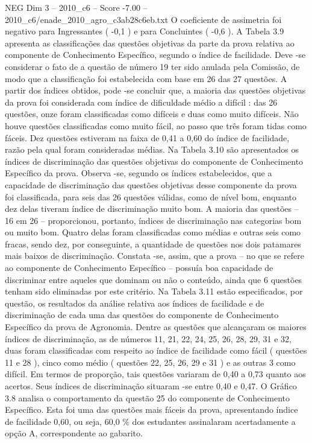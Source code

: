 \begin{textsample}{NEG Dim 3 – 2010\_c6 – Score -7.00 – 2010\_c6/enade\_2010\_agro\_c3ab28c6eb.txt}
O coeficiente de assimetria foi negativo para Ingressantes ( -0,1 ) e para Concluintes ( -0,6 ).
A Tabela 3.9 apresenta as classificações das questões objetivas da parte da prova relativa ao componente de Conhecimento Específico, segundo o índice de facilidade.
Deve -se considerar o fato de a questão de número 19 ter sido anulada pela Comissão, de modo que a classificação foi estabelecida com base em 26 das 27 questões.
A partir dos índices obtidos, pode -se concluir que, a maioria das questões objetivas da prova foi considerada com índice de dificuldade médio a difícil : das 26 questões, onze foram classificadas como difíceis e duas como muito difíceis.
Não houve questões classificadas como muito fácil, ao passo que três foram tidas como fáceis.
Dez questões estiveram na faixa de 0,41 a 0,60 do índice de facilidade, razão pela qual foram consideradas médias.
Na Tabela 3.10 são apresentados os índices de discriminação das questões objetivas do componente de Conhecimento Específico da prova.
Observa -se, segundo os índices estabelecidos, que a capacidade de discriminação das questões objetivas desse componente da prova foi classificada, para seis das 26 questões válidas, como de nível bom, enquanto dez delas tiveram índice de discriminação muito bom.
A maioria das questões – 16 em 26 – proporcionou, portanto, índices de discriminação nas categorias bom ou muito bom.
Quatro delas foram classificadas como médias e outras seis como fracas, sendo dez, por conseguinte, a quantidade de questões nos dois patamares mais baixos de discriminação.
Constata -se, assim, que a prova – no que se refere ao componente de Conhecimento Específico – possuía boa capacidade de discriminar entre aqueles que dominam ou não o conteúdo, ainda que 6 questões tenham sido eliminadas por este critério.
Na Tabela 3.11 estão especificados, por questão, os resultados da análise relativa aos índices de facilidade e de discriminação de cada uma das questões do componente de Conhecimento Específico da prova de Agronomia.
Dentre as questões que alcançaram os maiores índices de discriminação, as de números 11, 21, 22, 24, 25, 26, 28, 29, 31 e 32, duas foram classificadas com respeito ao índice de facilidade como fácil ( questões 11 e 28 ), cinco como médio ( questões 22, 25, 26, 29 e 31 ) e as outras 3 como difícil.
Em termos de proporção, tais questões variaram de 0,40 a 0,73 quanto aos acertos.
Seus índices de discriminação situaram -se entre 0,40 e 0,47.
O Gráfico 3.8 analisa o comportamento da questão 25 do componente de Conhecimento Específico.
Esta foi uma das questões mais fáceis da prova, apresentando índice de facilidade 0,60, ou seja, 60,0 \% dos estudantes assinalaram acertadamente a opção A, correspondente ao gabarito.

\end{textsample}
